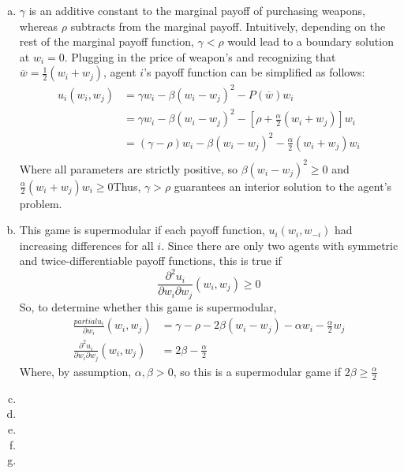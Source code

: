 \documentclass{article}
\begin{document}
\begin{enumerate}[(a)]
	\item $\gamma$ is an additive constant to the marginal payoff of purchasing weapons, whereas $\rho$ subtracts from the marginal payoff. Intuitively, depending on the rest of the marginal payoff function, ${\gamma<\rho}$ would lead to a boundary solution at $w_i=0$. Plugging in the price of weapon's and recognizing that ${\overline{w}=\frac{1}{2}(w_i + w_j)}$, agent $i$'s payoff function can be simplified as follows:
		\begin{align*}
			u_i(w_i,w_j) 	&= \gamma w_i - \beta(w_i-w_j)^2-P(\overline{w})w_i	\\
							&= \gamma w_i - \beta(w_i-w_j)^2-\left[\rho+\frac{\alpha}{2}(w_i + w_j)\right]w_i	\\
							&= (\gamma-\rho)w_i-\beta(w_i-w_j)^2 - \frac{\alpha}{2}(w_i+w_j) w_i	\\
		\end{align*}
		Where all parameters are strictly positive, so ${\beta(w_i-w_j)^2\geq0}$ and ${\frac{\alpha}{2}(w_i+w_j) w_i\geq0}$Thus, $\gamma>\rho$ guarantees an interior solution to the agent's problem.
	
	\item This game is supermodular if each payoff function, $u_i(w_i,w_{-i})$ had increasing differences for all $i$. Since there are only two agents with symmetric and twice-differentiable payoff functions, this is true if
		\[
			\frac{\partial^2 u_i}{\partial w_i \partial w_j}(w_i,w_j) \geq 0
		\]
		So, to determine whether this game is supermodular,
		\begin{align*}
			\frac{partial u_i}{\partial w_i}(w_i,w_j) &= \gamma-\rho-2\beta(w_i-w_j)-\alpha w_i - \frac{\alpha}{2}w_j	\\
			\frac{\partial^2 u_i}{\partial w_i \partial w_j}(w_i,w_j)  &= 2\beta - \frac{\alpha}{2}
		\end{align*}
		Where, by assumption, $\alpha,\beta >0$, so this is a supermodular game if ${2\beta \geq \frac{\alpha}{2}}$
	
	\item 
	
	\item 
	
	\item 
	
	\item 
	
	\item 
	
\end{enumerate}
\end{document}
